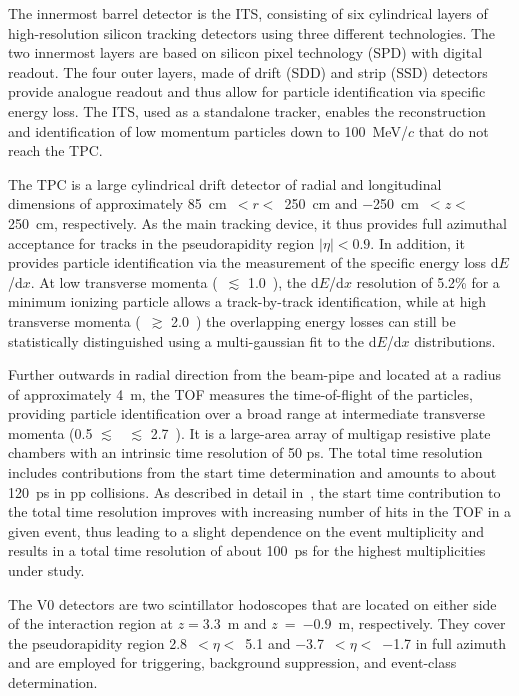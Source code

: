\documentclass[ALICE,manyauthors]{cernphprep}
\begin{document}
The innermost barrel detector is the ITS, consisting of six cylindrical layers of high-resolution silicon tracking detectors using three different technologies. The two innermost layers are based on silicon pixel technology (SPD) with digital readout. The four outer layers, made of drift (SDD) and strip (SSD) detectors provide analogue readout and thus allow for particle identification via specific energy loss. The ITS, used as a standalone tracker, enables the reconstruction and identification of low momentum particles down to 100~MeV/$c$ that do not reach the TPC.

The TPC is a large cylindrical drift detector of radial and longitudinal dimensions of approximately 85~cm~$< r <$~250~cm and  $-$250~cm~$< z <$~ 250~cm, respectively. As the main tracking device, it thus provides full azimuthal acceptance for tracks in the pseudorapidity region $|\eta| < 0.9$. In addition, it provides particle identification via the measurement of the specific energy loss d$E$/d$x$. At low transverse momenta (\pt\ $\lesssim$ 1.0~\gevc), the d$E$/d$x$ resolution of 5.2\% for a minimum ionizing particle allows a track-by-track identification, while at high transverse momenta (\pt\ $\gtrsim$ 2.0~\gevc) the overlapping energy losses can still be statistically distinguished using a multi-gaussian fit to the d$E$/d$x$ distributions.

Further outwards in radial direction from the beam-pipe and located at a radius of approximately 4~m, the TOF measures the time-of-flight of the particles, providing particle identification over a broad range at intermediate transverse momenta (0.5 $\lesssim$ \pt\ $\lesssim$ 2.7~\gevc). It is a large-area array of multigap resistive plate chambers with an intrinsic time resolution of 50 ps. The total time resolution includes contributions from the start time determination and amounts to about 120~ps in pp collisions. As described in detail in~\cite{Adam:2016ilk}, the start time contribution to the total time resolution improves with increasing number of hits in the TOF in a given event, thus leading to a slight dependence on the event multiplicity and results in a total time resolution of about 100~ps for the highest multiplicities under study. 

The V0 detectors are two scintillator hodoscopes that are located on either side of the interaction region at $z = 3.3$~m and $z$~=~$-0.9$~m, respectively. They cover the pseudorapidity region 2.8~$< \eta <$~5.1 and $-$3.7~$< \eta <$~$-$1.7 in full azimuth and are employed for triggering, background suppression, and event-class determination.
\end{document}
